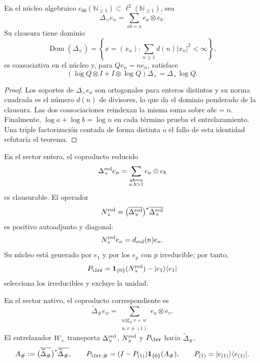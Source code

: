 \begin{theorem}
\label{int:pf84:C06}
En el núcleo algebraico
\(c_{00}(\mathbb N_{\geq1})\subset\ell^2(\mathbb N_{\geq1})\), sea
\[
 \Delta_\times e_n=\sum_{ab=n}e_a\otimes e_b.
\]
Su clausura tiene dominio
\[
 \operatorname{Dom}(\overline{\Delta_\times})
 =
 \left\{x=(x_n):
 \sum_{n\geq1}d(n)|x_n|^2<\infty\right\},
\]
es coasociativa en el núcleo y, para \(Qe_n=ne_n\), satisface
\[
 (\log Q\otimes I+I\otimes\log Q)\Delta_\times
 =\Delta_\times\log Q.
\]
\end{theorem}

\begin{proof}
Los soportes de \(\Delta_\times e_n\) son ortogonales para enteros distintos
y su norma cuadrada es el número \(d(n)\) de divisores, lo que da el dominio
ponderado de la clausura. Las dos coasociaciones reindexan la misma suma
sobre \(abc=n\). Finalmente, \(\log a+\log b=\log n\) en cada término
prueba el entrelazamiento. Una triple factorización contada de forma distinta
o el fallo de esta identidad refutaría el teorema.
\end{proof}

\begin{theorem}
\label{int:pf84:C07}
En el sector entero, el coproducto reducido
\[
 \Delta_\times^{\rm red}e_n
 =\sum_{\substack{ab=n\\a,b>1}}e_a\otimes e_b
\]
es clausurable. El operador
\[
 N_\times^{\rm red}
 =\bigl(\overline{\Delta_\times^{\rm red}}\bigr)^*
  \overline{\Delta_\times^{\rm red}}
\]
es positivo autoadjunto y diagonal:
\[
 N_\times^{\rm red}e_n=d_{\rm red}(n)e_n.
\]
Su núcleo está generado por \(e_1\) y por los \(e_p\) con \(p\) irreducible;
por tanto,
\[
 P_{\Irr}
 =\mathbf1_{\{0\}}(N_\times^{\rm red})
  -\lvert e_1\rangle\langle e_1\rvert
\]
selecciona los irreducibles y excluye la unidad.

En el sector nativo, el coproducto correspondiente es
\[
 \widetilde\Delta_\#e_w
 =\sum_{\substack{u\boxtimes_\#v=w\\u,v\ne(1)}}e_u\otimes e_v.
\]
El entrelazador \(W_\times\) transporta
\(\Delta_\times^{\rm red}\), \(N_\times^{\rm red}\) y \(P_{\Irr}\) hacia
\(\widetilde\Delta_\#\),
\[
 A_\#:=
 \bigl(\overline{\widetilde\Delta_\#}\bigr)^*
 \overline{\widetilde\Delta_\#},
 \qquad
 P_{\Irr,\#}
 =(I-P_{(1)})\mathbf1_{\{0\}}(A_\#),
 \qquad
 P_{(1)}=\lvert e_{(1)}\rangle\langle e_{(1)}\rvert.
\]
\end{theorem}

